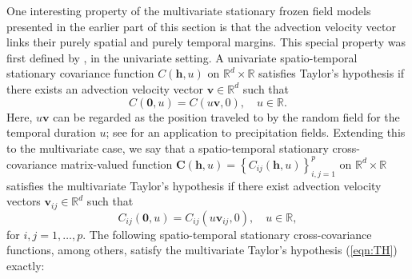\documentclass[12pt]{article}
\newcommand{\0}{\mathbf{0}}
\begin{document}
One interesting property of the multivariate stationary frozen field models presented in the earlier part of this section is that the advection velocity vector links their purely spatial and purely temporal margins. This special property was first defined by \citet{taylor1938spectrum}, in the univariate setting. A univariate spatio-temporal stationary covariance function $C(\mathbf{h},u)$ on $\mathbb{R}^d\times \mathbb{R}$ satisfies Taylor's hypothesis if there exists an advection velocity vector $\mathbf{v}\in\mathbb{R}^d$ such that 
\begin{equation}\label{eqn:uni_TH}
C(\mathbf{0},u)=C(u\mathbf{v},0),\quad u\in \mathbb{R}.
\end{equation}
Here, $u\mathbf{v}$ can be regarded as the position traveled to by the random field for the temporal duration $u$; see \cite{li2009statistical} for an application to precipitation fields. Extending this to the multivariate case, we say that a spatio-temporal stationary cross-covariance matrix-valued function $\mathbf{C}(\mathbf{h},u)=\left\{C_{ij}(\mathbf{h},u)\right\}_{i,j=1}^{p}$ on $\mathbb{R}^d\times \mathbb{R}$ satisfies the multivariate Taylor's hypothesis if there exist advection velocity vectors $\mathbf{v}_{ij}\in\mathbb{R}^d$ such that
\begin{equation}\label{eqn:TH}
C_{ij}(\mathbf{0},u)=C_{ij}(u\mathbf{v}_{ij},0),\quad u\in \mathbb{R},
\end{equation}
for $i,j=1,\ldots,p.$ The following spatio-temporal stationary cross-covariance functions, among others, satisfy the multivariate Taylor's hypothesis (\ref{eqn:TH}) exactly:
\end{document}
